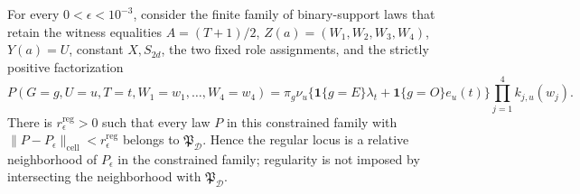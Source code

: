 For every \(0<\epsilon<10^{-3}\), consider the finite family of binary-support laws that retain the witness equalities \(A=(T+1)/2\), \(Z(a)=(W_1,W_2,W_3,W_4)\), \(Y(a)=U\), constant \(X,S_{2d}\), the two fixed role assignments, and the strictly positive factorization
\[
 P(G=g,U=u,T=t,W_1=w_1,\ldots,W_4=w_4)
 =\pi_g\nu_u
 \bigl\{\mathbf 1\{g=E\}\lambda_t+\mathbf 1\{g=O\}e_u(t)\bigr\}
 \prod_{j=1}^4 k_{j,u}(w_j).
\]
There is \(r_\epsilon^{\mathrm{reg}}>0\) such that every law \(P\) in this constrained family with \(\|P-P_\epsilon\|_{\mathrm{cell}}<r_\epsilon^{\mathrm{reg}}\) belongs to \(\mathfrak P_{\mathcal D}\).  Hence the regular locus is a relative neighborhood of \(P_\epsilon\) in the constrained family; regularity is not imposed by intersecting the neighborhood with \(\mathfrak P_{\mathcal D}\).